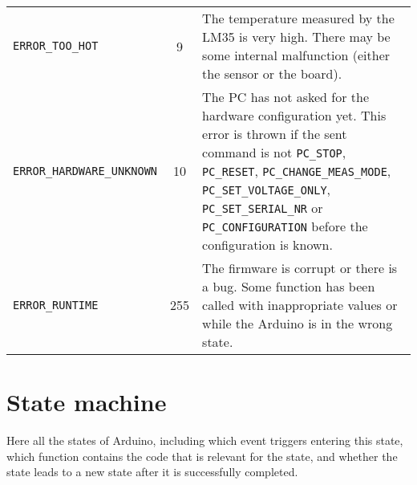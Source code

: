 \documentclass[11pt,a4paper,english]{article}
\begin{document}
\begin{itemize}
\begin{centering}
\begin{tabular}{lcp{}}
	\texttt{ERROR\_TOO\_HOT}            & 9     & The temperature measured by the LM35 is very high. There may be some internal malfunction (either the sensor or the board).\\
	\texttt{ERROR\_HARDWARE\_UNKNOWN}        & 10     & The PC has not asked for the hardware configuration yet. This error is thrown if the sent command is not \texttt{PC\_STOP}, \texttt{PC\_RESET}, \texttt{PC\_CHANGE\_MEAS\_MODE}, \texttt{PC\_SET\_VOLTAGE\_ONLY}, \texttt{PC\_SET\_SERIAL\_NR} or \texttt{PC\_CONFIGURATION} before the configuration is known.\\
	\texttt{ERROR\_RUNTIME}				& 255   & The firmware is corrupt or there is a bug. Some function has been called with inappropriate values or while the Arduino is in the wrong state.\\

	\bottomrule
	\end{tabular}
	\end{centering}
\end{itemize}


\clearpage

\section{State machine}\label{sec:state_machine}
Here all the states of Arduino, including which event triggers entering this state, which function contains the code that is relevant for the state, and whether the state leads to a new state after it is successfully completed.
\end{document}
